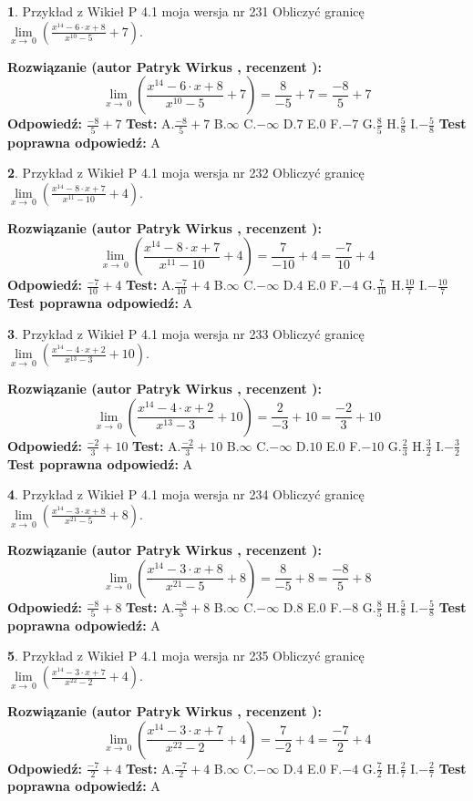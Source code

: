 \documentclass[12pt, a4paper]{article}
\theoremstyle{definition} %
\newtheorem{zad}{}
\newcommand{\zadStart}[1]{\begin{zad}#1\newline}
\newcommand{\zadStop}{\end{zad}}
\newcommand{\rozwStart}[2]{\noindent \textbf{Rozwiązanie (autor #1 , recenzent #2): }\newline}
\newcommand{\rozwStop}{\newline}
\newcommand{\odpStart}{\noindent \textbf{Odpowiedź:}\newline}
\newcommand{\odpStop}{\newline}
\newcommand{\testStart}{\noindent \textbf{Test:}\newline}
\newcommand{\testStop}{\newline}
\newcommand{\kluczStart}{\noindent \textbf{Test poprawna odpowiedź:}\newline}
\newcommand{\kluczStop}{\newline}
\begin{document}
\zadStart{Przykład z Wikieł P 4.1 moja wersja nr 231}
Obliczyć granicę $\lim\limits_{x\to\ 0}(\frac{x^{14}-6 \cdot x +8}{x^{10}-5}+7)$.
\zadStop
\rozwStart{Patryk Wirkus}{}
$$\lim\limits_{x\to\ 0}(\frac{x^{14}-6 \cdot x +8}{x^{10}-5}+7)=\frac{8}{-5}+7=\frac{-8}{5}+7$$
\rozwStop
\odpStart
$\frac{-8}{5}+7$
\odpStop
\testStart
A.$\frac{-8}{5}+7$
B.$\infty$
C.$-\infty$
D.$7$
E.$0$
F.$-7$
G.$\frac{8}{5}$
H.$\frac{5}{8}$
I.$-\frac{5}{8}$
\testStop
\kluczStart
A
\kluczStop



\zadStart{Przykład z Wikieł P 4.1 moja wersja nr 232}
Obliczyć granicę $\lim\limits_{x\to\ 0}(\frac{x^{14}-8 \cdot x +7}{x^{11}-10}+4)$.
\zadStop
\rozwStart{Patryk Wirkus}{}
$$\lim\limits_{x\to\ 0}(\frac{x^{14}-8 \cdot x +7}{x^{11}-10}+4)=\frac{7}{-10}+4=\frac{-7}{10}+4$$
\rozwStop
\odpStart
$\frac{-7}{10}+4$
\odpStop
\testStart
A.$\frac{-7}{10}+4$
B.$\infty$
C.$-\infty$
D.$4$
E.$0$
F.$-4$
G.$\frac{7}{10}$
H.$\frac{10}{7}$
I.$-\frac{10}{7}$
\testStop
\kluczStart
A
\kluczStop



\zadStart{Przykład z Wikieł P 4.1 moja wersja nr 233}
Obliczyć granicę $\lim\limits_{x\to\ 0}(\frac{x^{14}-4 \cdot x +2}{x^{13}-3}+10)$.
\zadStop
\rozwStart{Patryk Wirkus}{}
$$\lim\limits_{x\to\ 0}(\frac{x^{14}-4 \cdot x +2}{x^{13}-3}+10)=\frac{2}{-3}+10=\frac{-2}{3}+10$$
\rozwStop
\odpStart
$\frac{-2}{3}+10$
\odpStop
\testStart
A.$\frac{-2}{3}+10$
B.$\infty$
C.$-\infty$
D.$10$
E.$0$
F.$-10$
G.$\frac{2}{3}$
H.$\frac{3}{2}$
I.$-\frac{3}{2}$
\testStop
\kluczStart
A
\kluczStop



\zadStart{Przykład z Wikieł P 4.1 moja wersja nr 234}
Obliczyć granicę $\lim\limits_{x\to\ 0}(\frac{x^{14}-3 \cdot x +8}{x^{21}-5}+8)$.
\zadStop
\rozwStart{Patryk Wirkus}{}
$$\lim\limits_{x\to\ 0}(\frac{x^{14}-3 \cdot x +8}{x^{21}-5}+8)=\frac{8}{-5}+8=\frac{-8}{5}+8$$
\rozwStop
\odpStart
$\frac{-8}{5}+8$
\odpStop
\testStart
A.$\frac{-8}{5}+8$
B.$\infty$
C.$-\infty$
D.$8$
E.$0$
F.$-8$
G.$\frac{8}{5}$
H.$\frac{5}{8}$
I.$-\frac{5}{8}$
\testStop
\kluczStart
A
\kluczStop



\zadStart{Przykład z Wikieł P 4.1 moja wersja nr 235}
Obliczyć granicę $\lim\limits_{x\to\ 0}(\frac{x^{14}-3 \cdot x +7}{x^{22}-2}+4)$.
\zadStop
\rozwStart{Patryk Wirkus}{}
$$\lim\limits_{x\to\ 0}(\frac{x^{14}-3 \cdot x +7}{x^{22}-2}+4)=\frac{7}{-2}+4=\frac{-7}{2}+4$$
\rozwStop
\odpStart
$\frac{-7}{2}+4$
\odpStop
\testStart
A.$\frac{-7}{2}+4$
B.$\infty$
C.$-\infty$
D.$4$
E.$0$
F.$-4$
G.$\frac{7}{2}$
H.$\frac{2}{7}$
I.$-\frac{2}{7}$
\testStop
\kluczStart
A
\kluczStop
\end{document}
